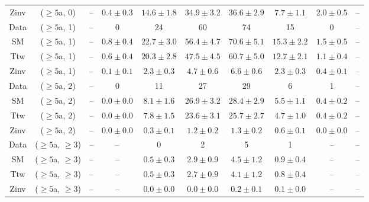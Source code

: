 \begin{table}[h!]
{\begin{tabular}{cccccccccc}
	Zinv & ($\ge5$a, 0) & -- & $0.4\pm 0.3$ & $14.6\pm 1.8$ & $34.9\pm 3.2$ & $36.6\pm 2.9$ & $7.7\pm 1.1$ & $2.0\pm 0.5$ & -- \\[0.5ex] 
	Data & ($\ge5$a, 1) & -- & 0 & 24 & 60 & 74 & 15 & 0 & -- \\[0.5ex] 
	SM & ($\ge5$a, 1) & -- & $0.8\pm 0.4$ & $22.7\pm 3.0$ & $56.4\pm 4.7$ & $70.6\pm 5.1$ & $15.3\pm 2.2$ & $1.5\pm 0.5$ & -- \\[0.5ex] 
	Ttw & ($\ge5$a, 1) & -- & $0.6\pm 0.4$ & $20.3\pm 2.8$ & $47.5\pm 4.5$ & $60.7\pm 5.0$ & $12.7\pm 2.1$ & $1.1\pm 0.4$ & -- \\[0.5ex] 
	Zinv & ($\ge5$a, 1) & -- & $0.1\pm 0.1$ & $2.3\pm 0.3$ & $4.7\pm 0.6$ & $6.6\pm 0.6$ & $2.3\pm 0.3$ & $0.4\pm 0.1$ & -- \\[0.5ex] 
	Data & ($\ge5$a, 2) & -- & 0 & 11 & 27 & 29 & 6 & 1 & -- \\[0.5ex] 
	SM & ($\ge5$a, 2) & -- & $0.0\pm 0.0$ & $8.1\pm 1.6$ & $26.9\pm 3.2$ & $28.4\pm 2.9$ & $5.5\pm 1.1$ & $0.4\pm 0.2$ & -- \\[0.5ex] 
	Ttw & ($\ge5$a, 2) & -- & $0.0\pm 0.0$ & $7.8\pm 1.5$ & $23.6\pm 3.1$ & $25.7\pm 2.7$ & $4.7\pm 1.0$ & $0.4\pm 0.2$ & -- \\[0.5ex] 
	Zinv & ($\ge5$a, 2) & -- & $0.0\pm 0.0$ & $0.3\pm 0.1$ & $1.2\pm 0.2$ & $1.3\pm 0.2$ & $0.6\pm 0.1$ & $0.0\pm 0.0$ & -- \\[0.5ex] 
	Data & ($\ge5$a, $\ge3$) & -- & -- & 0 & 2 & 5 & 1 & -- & -- \\[0.5ex] 
	SM & ($\ge5$a, $\ge3$) & -- & -- & $0.5\pm 0.3$ & $2.9\pm 0.9$ & $4.5\pm 1.2$ & $0.9\pm 0.4$ & -- & -- \\[0.5ex] 
	Ttw & ($\ge5$a, $\ge3$) & -- & -- & $0.5\pm 0.3$ & $2.7\pm 0.9$ & $4.1\pm 1.2$ & $0.8\pm 0.4$ & -- & -- \\[0.5ex] 
	Zinv & ($\ge5$a, $\ge3$) & -- & -- & $0.0\pm 0.0$ & $0.0\pm 0.0$ & $0.2\pm 0.1$ & $0.1\pm 0.0$ & -- & -- \\[0.5ex] 
	\hline
	\hline
\end{tabular}}
\end{table}
